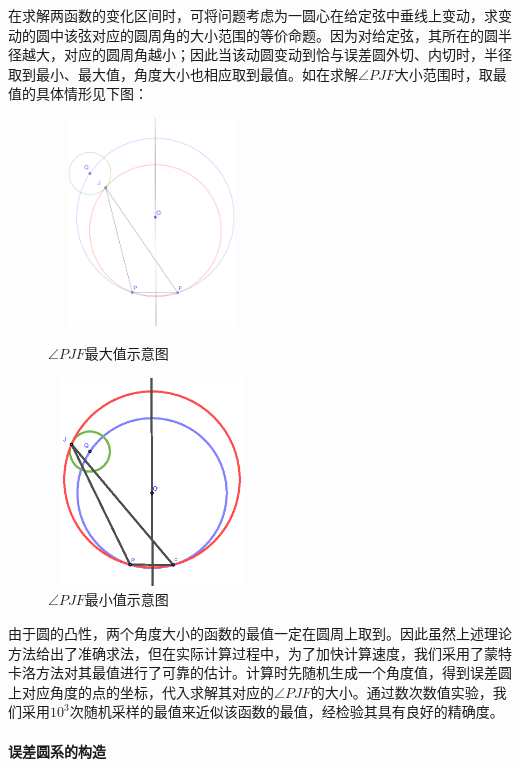 \documentclass{ctexart}
\newcommand{\subsubsubsection}[1]{\paragraph{#1}\mbox{}\\}
\begin{document}
在求解两函数的变化区间时，可将问题考虑为一圆心在给定弦中垂线上变动，求变动的圆中该弦对应的圆周角的大小范围的等价命题。因为对给定弦，其所在的圆半径越大，对应的圆周角越小；因此当该动圆变动到恰与误差圆外切、内切时，半径取到最小、最大值，角度大小也相应取到最值。如在求解$\angle PJF$大小范围时，取最值的具体情形见下图：

  \begin{figure}[H]
    \begin{minipage}[t]{0.45\linewidth}
    \centering
    \includegraphics[height=5.5cm,width=5.5cm]{pic/angle_max.eps}
    \caption{$\angle PJF$最大值示意图}
    \end{minipage}%
    \begin{minipage}[t]{0.45\linewidth}
    \centering
    \includegraphics[height=5.5cm,width=5.5cm]{pic/angle_min.eps}
    \caption{$\angle PJF$最小值示意图}
    \end{minipage}
    \end{figure}


由于圆的凸性，两个角度大小的函数的最值一定在圆周上取到。因此虽然上述理论方法给出了准确求法，但在实际计算过程中，为了加快计算速度，我们采用了蒙特卡洛方法对其最值进行了可靠的估计。计算时先随机生成一个角度值，得到误差圆上对应角度的点的坐标，代入求解其对应的$\angle PJF$的大小。通过数次数值实验，我们采用$10^3$次随机采样的最值来近似该函数的最值，经检验其具有良好的精确度。


  \subsubsubsection{误差圆系的构造}
\end{document}
